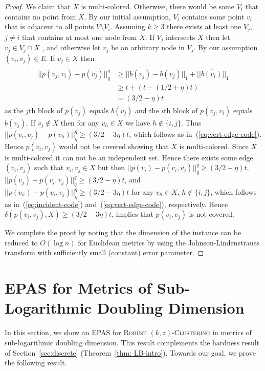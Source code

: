 \documentclass[11pt]{article}
\newcommand{\rkc}{\textsc{Robust $(k,z)$-Clustering}\xspace}
\begin{document}
\begin{proof}
We claim that $X$ is multi-colored. Otherwise, there would be some $V_i$ that contains no point from $X$. By our initial assumption, $V_i$ contains some point $v_i$ that is adjacent to all points $V\setminus V_i$. Assuming $k\geq 3$ there exists at least one $V_j$, $j\neq i$ that contains at most one node from $X$. If $V_j$ intersects $X$ then let $v_j\in V_j \cap X$ , and otherwise let $v_j$ be an arbitrary node in $V_j$. By our assumption $(v_i,v_j)\in E$. If $v_j\in X$ then 
\begin{align}\label{eq:incident-code}
\begin{split}
 ||p(v_j,v_i)-p(v_j)||_q^q & \geq ||\overline{b(v_j)}-b(v_j)||_1+||\overline{b(v_i)}||_1\\
 & \geq t+(t-(1/2+\eta)t)\\
 & = (3/2-\eta)t
\end{split}
\end{align}
 as the $j$th block of $p(v_j)$ equals $b(v_j)$ and the $i$th block of $p(v_j,v_i)$ equals~$\overline{b(v_j)}$. If $v_j\notin X$ then for any $v_h\in X$ we have $h\notin\{i,j\}$. 
Thus $||p(v_i,v_j)-p(v_h)||_q^q\geq (3/2-3\eta)t$, which follows as in~(\ref{eq:vert-edge-code}). Hence $p(v_i,v_j)$ would not be covered showing that $X$ is multi-colored.
Since $X$ is multi-colored it can not be an independent set. Hence there exists some edge $(v_i,v_j)$ such that $v_i,v_j\in X$ but then $||p(v_i)-p(v_i,v_j)||_q^q\geq (3/2-\eta)t$, $||p(v_j)-p(v_i,v_j)||_q^q\geq (3/2-\eta)t$, and $||p(v_h)-p(v_i,v_j)||_q^q\geq (3/2-3\eta)t$ for any $v_h\in X$, $h\notin\{i,j\}$, which follows as in~(\ref{eq:incident-code}) and~(\ref{eq:vert-edge-code}), respectively. Hence $\delta(p(v_i,v_j),X)\geq (3/2-3\eta)t$, implies that $p(v_i,v_j)$ is not covered.

We complete the proof by noting that the dimension of the instance can be reduced to $O(\log n)$ for Euclidean metrics by using the Johnson-Lindenstrauss transform with sufficiently small (constant) error parameter.
\end{proof}






\section{EPAS for Metrics of Sub-Logarithmic Doubling Dimension}\label{sec:paskd_sfc}

In this section, we show an EPAS for \rkc in  metrics of  sub-logarithmic doubling dimension. This result complements the hardness result of Section~\ref{sec:discrete} (Theorem~\ref{thm: LB-intro}). Towards our goal, we prove the following result. 
\end{document}
